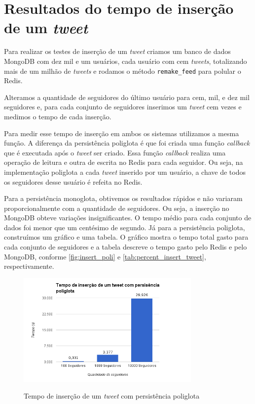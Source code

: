 \section{Resultados do tempo de inserção de um \textit{tweet}}
\label{sec:resultInsertTweet}
Para realizar os testes de inserção de um \textit{tweet} criamos um banco de dados MongoDB com dez mil e um usuários, cada usuário com cem \textit{tweets}, totalizando mais de um milhão de \textit{tweets} e rodamos o método \verb|remake_feed| para polular o \ac{Redis}.

Alteramos a quantidade de seguidores do último usuário para cem, mil, e dez mil seguidores e, para cada conjunto de seguidores inserimos um \textit{tweet} cem vezes e medimos o tempo de cada inserção.

Para medir esse tempo de inserção em ambos os sistemas utilizamos a mesma função. A diferença da persistência poliglota é que foi criada uma função \textit{callback} que é executada após o \textit{tweet} ser criado. Essa função \textit{callback} realiza uma operação de leitura e outra de escrita no \ac{Redis} para cada seguidor. Ou seja, na implementação poliglota a cada \textit{tweet} inserido por um usuário, a chave de todos os seguidores desse usuário é refeita no \ac{Redis}.

Para a persistência monoglota, obtivemos os resultados rápidos e não variaram proporcionalmente com a quantidade de seguidores. Ou seja, a inserção no MongoDB obteve variações insignificantes. O tempo médio para cada conjunto de dados foi menor que um centésimo de segundo.
Já para a persistência poliglota, construímos um gráfico e uma tabela. O gráfico mostra o tempo total gasto para cada conjunto de seguidores e a tabela descreve o tempo gasto pelo \ac{Redis} e pelo MongoDB, conforme \autoref{fig:insert_poli} e \autoref{tab:percent_insert_tweet}, respectivamente.

\begin{figure}[H]
    \centering
    \caption{Tempo de inserção de um \textit{tweet} com persistência poliglota}
    \includegraphics[width=0.8\textwidth]{./04-figuras/insert_poli.png}
    \label{fig:insert_poli}
\end{figure}

